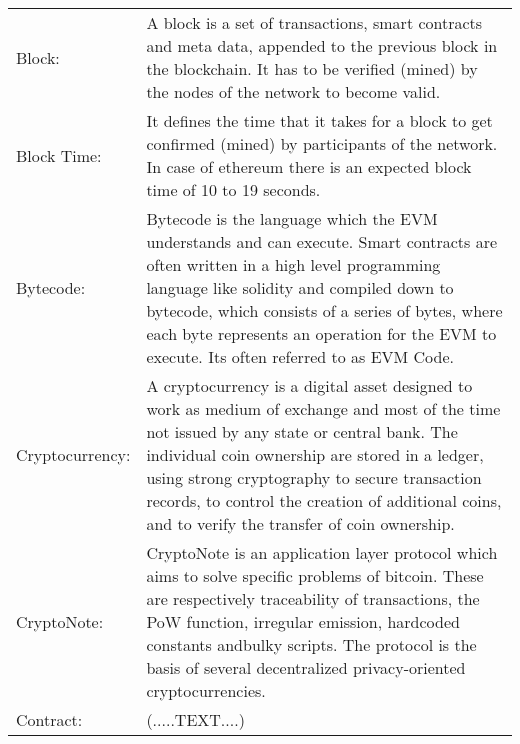 \clearpage

\begin{center}
	\begin{tabular}{ p{4cm} p{8cm} }
		Block: & A block is a set of transactions, smart contracts and meta data, appended to the previous block in the blockchain. It has to be verified (mined) by the nodes of the network to become valid. \\
		Block Time: & It defines the time that it takes for a block to get confirmed (mined) by participants of the network. In case of ethereum there is an expected block time of 10 to 19 seconds. \\
		Bytecode: & Bytecode is the language which the \ac{EVM} understands and can execute. Smart contracts are often written in a high level programming language like solidity and compiled down to bytecode, which consists of a series of bytes, where each byte represents an operation for the \ac{EVM} to execute. Its often referred to as \ac{EVM Code}. \\
		Cryptocurrency: & A cryptocurrency is a digital asset designed to work as medium of exchange and most of the time not issued by any state or central bank. The individual coin ownership are stored in a ledger, using strong cryptography to secure transaction records, to control the creation of additional coins, and to verify the transfer of coin ownership. \\
		CryptoNote: & CryptoNote is an application layer protocol which aims to solve specific problems of bitcoin. These are respectively traceability of transactions, the \ac{PoW} function, irregular emission, hardcoded constants andbulky scripts. The protocol is the basis of several decentralized privacy-oriented cryptocurrencies. \\
		Contract:  & (.....TEXT....) \\
	\end{tabular}
\end{center}

\clearpage

